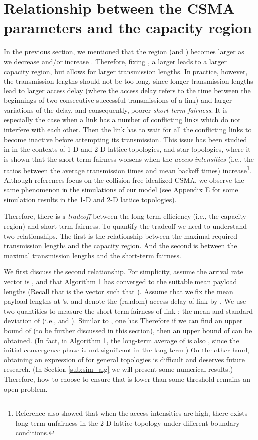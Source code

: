 \documentclass{IEEEtran}
\begin{document}
\section{\label{sec:capacity-region}Relationship between the CSMA parameters
and the capacity region}

In the previous section, we mentioned that the region 
(and ) becomes larger as we decrease
 and/or increase . Therefore, fixing ,
a larger  leads to a larger capacity region, but allows
for larger transmission lengths. In practice, however, the transmission
lengths should not be too long, since longer transmission lengths\textbf{
}lead to larger access delay (where the access delay refers to the
time between the beginnings of two consecutive successful transmissions
of a link) and larger variations of the delay, and consequently, poorer
\emph{short-term fairness}. It is especially the case when a link
has a number of conflicting links which do not interfere with each
other. Then the link has to wait for all the conflicting links to
become inactive before attempting its transmission. This issue has
been studied in \cite{Thiran}\cite{conv_MS}\cite{BoE} in the contexts
of 1-D and 2-D lattice topologies, and star topologies, where it is
shown that the short-term fairness worsens when the \emph{access intensities}
(i.e., the ratios between the average transmission times and mean
backoff times) increase\footnote{Reference \cite{Thiran} also showed that when the access intensities
are high, there exists long-term unfairness in the 2-D lattice topology
under different boundary conditions.}. Although references \cite{Thiran}\cite{conv_MS}\cite{BoE} focus
on the collision-free idealized-CSMA, we observe the same phenomenon
in the simulations of our model (see Appendix E for some simulation
results in the 1-D and 2-D lattice topologies). 

Therefore, there is a \emph{tradeoff} between the long-term efficiency
(i.e., the capacity region) and short-term fairness. To quantify the
tradeoff we need to understand two relationships. The first is the
relationship between the maximal required transmission lengths and
the capacity region. And the second is between the maximal transmission
lengths and the short-term fairness. 

We first discuss the second relationship. For simplicity, assume the
arrival rate vector is , and that Algorithm 1 has
converged to the suitable mean payload lengths 
(Recall that  is the vector such that
). Assume
that we fix the mean payload lengths at 's, and denote
the (random) access delay of link  by . We use two quantities
to measure the short-term fairness of link : the mean and standard
deviation of  (i.e.,  and ).
Similar to \cite{conv_MS}, one has
Therefore if we can find an upper bound of 
(to be further discussed in this section), then an upper bound of
 can be obtained. (In fact, in Algorithm 1, the long-term
average of  is also , since the initial
convergence phase is not significant in the long term.) On the other
hand, obtaining an expression of  for general
topologies is difficult and deserves future research. (In Section
\ref{sub:sim_alg} we will present some numerical results.) Therefore,
how to choose  to ensure that  is lower
than some threshold remains an open problem.
\end{document}
